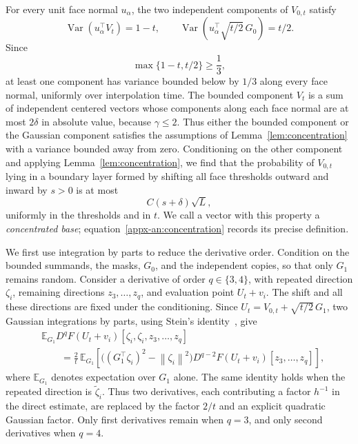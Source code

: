 \documentclass[11pt,letterpaper]{article}
\theoremstyle{remark}
\newcommand{\E}{\mathbb E}
\newcommand{\Var}{\operatorname{Var}}
\newcommand{\norm}[1]{\left\lVert#1\right\rVert}
\begin{document}
For every unit face normal \(u_\alpha\), the two independent
components of \(V_{0,t}\) satisfy
\[
 \Var(u_\alpha^\top V_t)=1-t,
 \qquad
 \Var\!\left(u_\alpha^\top\sqrt{t/2}\,G_0\right)=t/2.
\]
Since
\[
 \max\{1-t,t/2\}\ge\frac13,
\]
at least one component has variance bounded below by \(1/3\) along
every face normal, uniformly over interpolation time. The bounded
component \(V_t\) is a sum of independent centered vectors whose
components along each face normal are at most \(2\delta\) in absolute
value, because \(\gamma\le2\). Thus either the bounded component or
the Gaussian component satisfies the assumptions of
Lemma~\ref{lem:concentration} with a variance bounded away from zero.
Conditioning on the other component and applying
Lemma~\ref{lem:concentration}, we find that the probability of
\(V_{0,t}\) lying in a boundary layer formed by shifting all face
thresholds outward and inward by \(s>0\) is at most
\[
 C(s+\delta)\sqrt L,
\]
uniformly in the thresholds and in \(t\). We call a vector with this
property a \emph{concentrated base}; equation~\eqref{appx-an:concentration}
records its precise definition.

We first use integration by parts to reduce the derivative order.
Condition on the bounded summands, the masks, \(G_0\), and the
independent copies, so that only \(G_1\) remains random. Consider
a derivative of order \(q\in\{3,4\}\), with repeated direction
\(\zeta_i\), remaining directions \(z_3,\ldots,z_q\), and evaluation
point \(U_t+v_i\). The shift and all these directions are fixed under
the conditioning. Since \(U_t=V_{0,t}+\sqrt{t/2}\,G_1\), two Gaussian
integrations by parts, using Stein's identity~\cite{Stein1981}, give
\[
 \begin{aligned}
 &\E_{G_1}D^qF(U_t+v_i)
       [\zeta_i,\zeta_i,z_3,\ldots,z_q]\\
 &\qquad=\frac2t\,\E_{G_1}\!\left[
   \bigl((G_1^\top\zeta_i)^2-\norm{\zeta_i}^2\bigr)
   D^{q-2}F(U_t+v_i)[z_3,\ldots,z_q]
   \right],
 \end{aligned}
\]
where \(\E_{G_1}\) denotes expectation over \(G_1\) alone.
The same identity holds when the repeated direction is
\(\widetilde\zeta_i\). Thus two derivatives, each contributing a
factor \(h^{-1}\) in the direct estimate, are replaced by the factor
\(2/t\) and an explicit quadratic Gaussian factor. Only first
derivatives remain when \(q=3\), and only second derivatives when
\(q=4\).
\end{document}
